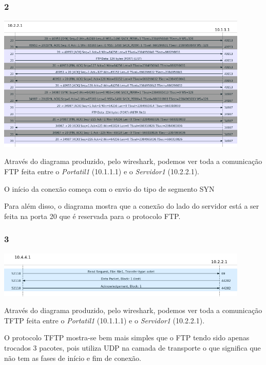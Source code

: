 \documentclass{article}
\begin{document}
            \subsubsection*{2}
                {
                    \centering
                    \includegraphics[width=12cm]{images/ftp-flow-graph.png}
                    \par
                }
                    Através do diagrama produzido, pelo wireshark, podemos ver toda a comunicação FTP feita entre o \textit{Portatil1} (10.1.1.1) e o \textit{Servidor1} (10.2.2.1).

		            O início da conexão começa com o envio do tipo de segmento SYN

                    Para além disso, o diagrama mostra que a conexão do lado do servidor está a ser feita na porta 20 que é reservada para o protocolo FTP.
            \subsubsection*{3}
                {
                    \centering
                    \includegraphics[width=12cm]{images/tftp-wireshark-flow-graph.png}
                    \par
                }
		            Através do diagrama produzido, pelo wireshark, podemos ver toda a comunicação TFTP feita entre o \textit{Portatil1} (10.1.1.1) e o \textit{Servidor1} (10.2.2.1).

                    O protocolo TFTP mostra-se bem mais simples que o FTP tendo sido apenas trocados 3 pacotes, pois utiliza UDP na camada de transporte o que significa que não tem as fases de início e fim de conexão.
\end{document}
